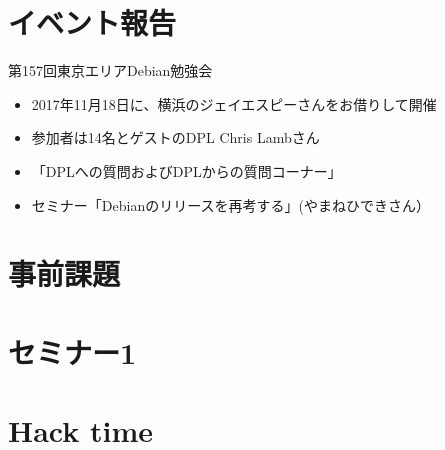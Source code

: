 \section{イベント報告}

\begin{frame}{第157回東京エリアDebian勉強会}
\begin{itemize}
\item 2017年11月18日に、横浜のジェイエスピーさんをお借りして開催
\item 参加者は14名とゲストのDPL Chris Lambさん
\item 「DPLへの質問およびDPLからの質問コーナー」
\item セミナー「Debianのリリースを再考する」(やまねひできさん）
\end{itemize} 
\end{frame}


\section{事前課題}
{\footnotesize
 
}

%

\section{セミナー1}

\section{Hack time}

  
